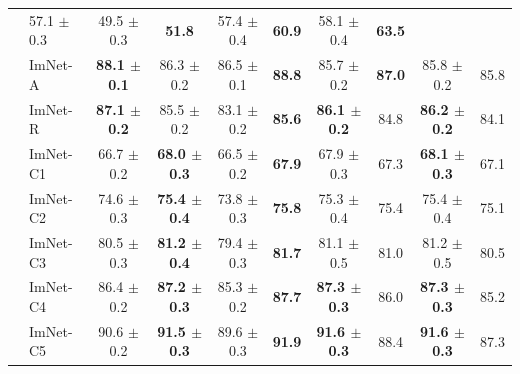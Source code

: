 \documentclass{article}
\begin{document}
\begin{table}[H]
\begin{center}
\begin{small}
\begin{tabular}{ l l | c | c | c c | c c | c c }
                 & 57.1 {\tiny $\pm$ 0.3} %
                 & 49.5 {\tiny $\pm$ 0.3} & \bf{51.8} %
                 & 57.4 {\tiny $\pm$ 0.4} & \bf{60.9} %
                 & 58.1 {\tiny $\pm$ 0.4} & \bf{63.5} \\ %
    & ImNet-A    & \bf{88.1} {\tiny $\pm$ 0.1} %
                 & 86.3 {\tiny $\pm$ 0.2} %
                 & 86.5 {\tiny $\pm$ 0.1} & \bf{88.8} %
                 & 85.7 {\tiny $\pm$ 0.2} & \bf{87.0} %
                 & 85.8 {\tiny $\pm$ 0.2} & 85.8 \\ %
    & ImNet-R    & \bf{87.1} {\tiny $\pm$ 0.2} %
                 & 85.5 {\tiny $\pm$ 0.2} %
                 & 83.1 {\tiny $\pm$ 0.2} & \bf{85.6} %
                 & \bf{86.1} {\tiny $\pm$ 0.2} & 84.8 %
                 & \bf{86.2} {\tiny $\pm$ 0.2} & 84.1 \\ %
    & ImNet-C1   & 66.7 {\tiny $\pm$ 0.2} %
                 & \bf{68.0} {\tiny $\pm$ 0.3} %
                 & 66.5 {\tiny $\pm$ 0.2} & \bf{67.9} %
                 & 67.9 {\tiny $\pm$ 0.3} & 67.3 %
                 & \bf{68.1} {\tiny $\pm$ 0.3} & 67.1 \\ %
    & ImNet-C2   & 74.6 {\tiny $\pm$ 0.3} %
                 & \bf{75.4} {\tiny $\pm$ 0.4} %
                 & 73.8 {\tiny $\pm$ 0.3} & \bf{75.8} %
                 & 75.3 {\tiny $\pm$ 0.4} & 75.4 %
                 & 75.4 {\tiny $\pm$ 0.4} & 75.1 \\ %
    & ImNet-C3   & 80.5 {\tiny $\pm$ 0.3} %
                 & \bf{81.2} {\tiny $\pm$ 0.4} %
                 & 79.4 {\tiny $\pm$ 0.3} & \bf{81.7} %
                 & 81.1 {\tiny $\pm$ 0.5} & 81.0 %
                 & 81.2 {\tiny $\pm$ 0.5} & 80.5 \\ %
    & ImNet-C4   & 86.4 {\tiny $\pm$ 0.2} %
                 & \bf{87.2} {\tiny $\pm$ 0.3} %
                 & 85.3 {\tiny $\pm$ 0.2} & \bf{87.7} %
                 & \bf{87.3} {\tiny $\pm$ 0.3} & 86.0 %
                 & \bf{87.3} {\tiny $\pm$ 0.3} & 85.2 \\ %
    & ImNet-C5   & 90.6 {\tiny $\pm$ 0.2} %
                 & \bf{91.5} {\tiny $\pm$ 0.3} %
                 & 89.6 {\tiny $\pm$ 0.3} & \bf{91.9} %
                 & \bf{91.6} {\tiny $\pm$ 0.3} & 88.4 %
                 & \bf{91.6} {\tiny $\pm$ 0.3} & 87.3 \\ %
    \bottomrule
  \end{tabular}
  \end{small}
  \end{center}
\end{table}
\end{document}
